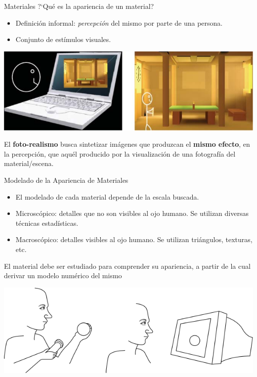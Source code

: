 \documentclass[spanish]{beamer}
\begin{document}
\begin{frame}{Materiales}
?`Qué es la apariencia de un material?
\begin{itemize}
\item Definición informal: {\em percepción} del mismo por parte de una persona.
\item Conjunto de estímulos visuales.

\end{itemize}

\centerline{\includegraphics[scale = 0.25]{../figures/fotorealismo}}

El \textbf{foto-realismo} busca sintetizar imágenes que produzcan el \textbf{mismo efecto}, en la percepción, que aquél producido por la visualización de una fotografía del material/escena.
\end{frame}


\begin{frame}{Modelado de la Apariencia de Materiales}
\begin{block}{}
\begin{itemize}
\item El modelado de cada material depende de la escala buscada.
\item Microscópico: detalles que no son visibles al ojo humano. Se utilizan diversas técnicas estadísticas.
\item Macroscópico: detalles visibles al ojo humano. Se utilizan triángulos, texturas, etc.
\end{itemize}
\end{block}
El material debe ser estudiado para comprender su apariencia, a partir de la cual derivar un modelo numérico del mismo

\centerline{\includegraphics[scale = 0.25]{../figures/apariencia}}
\end{frame}
\end{document}
